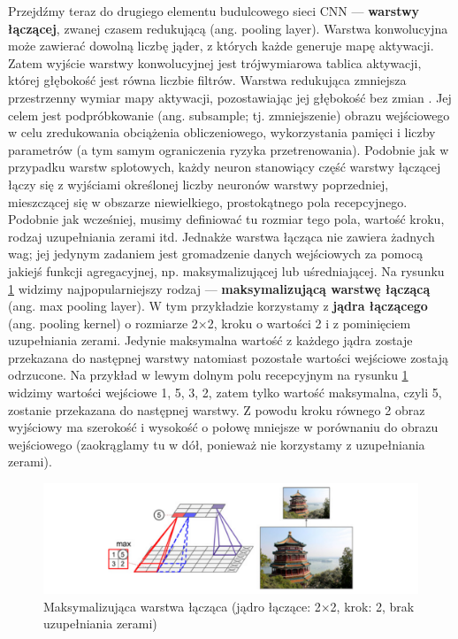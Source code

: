 \documentclass[12pt]{mwbk}
\theoremstyle{plain}
\theoremstyle{definition}
\theoremstyle{remark}
\newcommand\zrodlo[1]{\par\vspace{-3mm}{\small\textit{Źródło: }#1 }}
\begin{document}
Przejdźmy teraz do drugiego elementu budulcowego sieci CNN — \textbf{warstwy łączącej}, zwanej czasem redukującą (ang. pooling layer). Warstwa konwolucyjna może zawierać dowolną liczbę jąder, z których każde generuje mapę aktywacji. Zatem wyjście warstwy konwolucyjnej jest trójwymiarowa tablica aktywacji, której głębokość jest równa liczbie filtrów. Warstwa redukująca zmniejsza przestrzenny wymiar mapy aktywacji, pozostawiając jej głębokość bez zmian \cite{illustrated}. Jej celem jest podpróbkowanie
(ang. subsample; tj. zmniejszenie) obrazu wejściowego w celu zredukowania obciążenia obliczeniowego,
wykorzystania pamięci i liczby parametrów (a tym samym ograniczenia ryzyka przetrenowania).
Podobnie jak w przypadku warstw splotowych, każdy neuron stanowiący część warstwy łączącej
łączy się z wyjściami określonej liczby neuronów warstwy poprzedniej, mieszczącej się w obszarze
niewielkiego, prostokątnego pola recepcyjnego. Podobnie jak wcześniej, musimy definiować tu
rozmiar tego pola, wartość kroku, rodzaj uzupełniania zerami itd. Jednakże warstwa łącząca nie zawiera
żadnych wag; jej jedynym zadaniem jest gromadzenie danych wejściowych za pomocą jakiejś funkcji agregacyjnej, np. maksymalizującej lub uśredniającej. Na rysunku \ref{fig:max-pooling-layer} widzimy najpopularniejszy
rodzaj — \textbf{maksymalizującą warstwę łączącą} (ang. max pooling layer). W tym przykładzie korzystamy
z \textbf{jądra łączącego}  (ang. pooling kernel) o rozmiarze 2×2, kroku o wartości 2 i z pominięciem uzupełniania zerami. Jedynie maksymalna wartość z każdego jądra zostaje przekazana do następnej warstwy natomiast pozostałe wartości wejściowe zostają odrzucone. Na przykład w lewym dolnym polu recepcyjnym na rysunku \ref{fig:max-pooling-layer} widzimy wartości wejściowe 1, 5, 3, 2, zatem tylko wartość maksymalna, czyli 5, zostanie przekazana do następnej warstwy. Z powodu kroku równego 2 obraz wyjściowy ma szerokość i wysokość o połowę mniejsze w porównaniu do obrazu wejściowego (zaokrąglamy tu w dół, ponieważ nie korzystamy z uzupełniania zerami).

\begin{figure}[!h]
	\centering
	\includegraphics[width=\linewidth]{rys/max_pooling_layer.png}
	\caption{Maksymalizująca warstwa łącząca (jądro łączące: 2×2, krok: 2, brak uzupełniania zerami)}
	\zrodlo{\cite{geron}}
	\label{fig:max-pooling-layer}
\end{figure}
\end{document}
